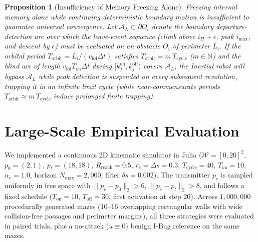 \documentclass[10pt, a4paper, twocolumn]{article}
\newtheorem{proposition}{Proposition}
\begin{document}
\begin{proposition}[Insufficiency of Memory Freezing Alone]
\label{prop:resonance}
Freezing internal memory alone while continuing deterministic boundary motion is insufficient to guarantee universal convergence. Let $\mathcal{A}_L \subset \partial O_i$ denote the boundary departure-detection arc over which the leave-event sequence (climb above $i_H + \epsilon$, peak $i_{\max}$, and descent by $\epsilon$) must be evaluated on an obstacle $O_i$ of perimeter $L_i$. If the orbital period $T_{\text{orbit}} = L_i / (v_{\text{fol}}\Delta t)$ satisfies $T_{\text{orbit}} = m\,T_{\text{cycle}}$ ($m \in \mathbb{N}$) and the blind arc of length $v_{\text{fol}} T_{\text{on}}\Delta t$ during $[k_j^{\text{on}}, k_j^{\text{off}})$ covers $\mathcal{A}_L$, the Inertial robot will bypass $\mathcal{A}_L$ while peak detection is suspended on every subsequent revolution, trapping it in an infinite limit cycle (while near-commensurate periods $T_{\text{orbit}} \approx m\,T_{\text{cycle}}$ induce prolonged finite trapping).
\end{proposition}

\section{Large-Scale Empirical Evaluation}
We implemented a continuous 2D kinematic simulator in Julia ($\mathcal{W} = [0, 20]^2$, $p_0 = (2, 1)$, $p_t = (18, 18)$, $R_{\text{reach}} = 0.5$, $r_c = \Delta s = 0.3$, $T_{\text{cycle}} = 40$, $T_{\text{on}} = 10$, $\alpha_e = 1.0$, horizon $N_{\max} = 2,000$, filter $\delta s = 0.002$). The transmitter $p_e$ is sampled uniformly in free space with $\|p_e - p_0\|_2 > 6$, $\|p_e - p_t\|_2 > 8$, and follows a fixed schedule ($T_{\text{on}} = 10$, $T_{\text{off}} = 30$, first activation at step $20$). Across $1,000,000$ procedurally generated mazes (10--16 overlapping rectangular walls with wide collision-free passages and perimeter margins), all three strategies were evaluated in paired trials, plus a no-attack ($u \equiv 0$) benign I-Bug reference on the same mazes.
\end{document}

